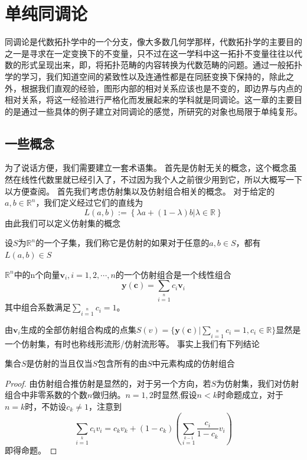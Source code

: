 \chapter{单纯同调论}
同调论是代数拓扑学中的一个分支，像大多数几何学那样，代数拓扑学的主要目的之一是寻求在一定变换下的不变量，只不过在这一学科中这一拓扑不变量往往以代数的形式呈现出来，即，将拓扑范畴的内容转换为代数范畴的问题。通过一般拓扑学的学习，我们知道空间的紧致性以及连通性都是在同胚变换下保持的，除此之外，根据我们直观的经验，图形内部的相对关系应该也是不变的，即边界与内点的相对关系，将这一经验进行严格化而发展起来的学科就是同调论。这一章的主要目的是通过一些具体的例子建立对同调论的感觉，所研究的对象也局限于单纯复形。
\section{一些概念}
为了说话方便，我们需要建立一套术语集。
首先是仿射无关的概念，这个概念虽然在线性代数里就已经引入了，不过因为我个人之前很少用到它，所以大概写一下以方便查阅。
首先我们考虑仿射集以及仿射组合相关的概念。
对于给定的$a,b\in\mathbb{R}^{n}$，我们定义经过它们的直线为
\begin{equation}
    L(a,b):=\left\{\lambda a+(1-\lambda)b|\lambda\in\mathbb{R}\right\}
\end{equation}
由此我们可以定义仿射集的概念
\begin{definition}[仿射集]
设$S$为$\mathbb{R}^{n}$的一个子集，我们称它是仿射的如果对于任意的$a,b\in S$，都有$L(a,b)\in S$
\end{definition}
\begin{definition}[仿射组合]
$\mathbb{R}^{n}$中的n个向量$\textbf{v}_{i},i=1,2,\cdots,n$的一个仿射组合是一个线性组合
\begin{equation}
    \textbf{y}(\textbf{c})=\sum\limits_{i=1}\limits^{n}{c}_{i}\textbf{v}_{i}
\end{equation}
其中组合系数满足$\sum\limits_{i=1}\limits^{n}{c}_{i}=1$。\\
\end{definition}
由$\mathbf{v}_{i}$生成的全部仿射组合构成的点集$S(v)=\{\textbf{y}(\textbf{c})|\sum\limits_{i=1}\limits^{n}{c}_{i}=1,c_{i}\in \mathbb{R}\}$显然是一个仿射集，有时也称线形流形/仿射流形等。
事实上我们有下列结论
\begin{proposition}
集合$S$是仿射的当且仅当$S$包含所有的由$S$中元素构成的仿射组合
\end{proposition}
\begin{proof}
由仿射组合推仿射是显然的，对于另一个方向，若$S$为仿射集，我们对仿射组合中非零系数的个数$n$做归纳。$n=1,2$时显然,假设$n<k$时命题成立，对于$n=k$时，不妨设$c_{k}\neq 1$，注意到
\begin{equation}
    \sum\limits_{i=1}\limits^{k}{c}_{i}v_{i}=c_{k}v_{k}+(1-c_{k})\left(\sum\limits_{i=1}\limits^{k-1}\frac{c_{i}}{1-c_{k}}v_{i}\right)
\end{equation}
即得命题。
\end{proof}

